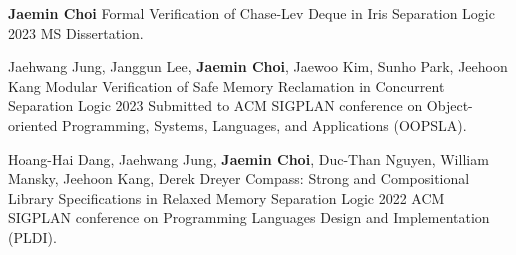 

\begin{cventries}

  \cventry
    {\textbf{Jaemin Choi}} %
    {Formal Verification of Chase-Lev Deque in Iris Separation Logic} %
    {} %
    {2023} %
    {
      MS Dissertation.
    }

  \cventry
    {Jaehwang Jung, Janggun Lee, \textbf{Jaemin Choi}, Jaewoo Kim, Sunho Park, Jeehoon Kang} %
    {Modular Verification of Safe Memory Reclamation in Concurrent Separation Logic} %
    {} %
    {2023} %
    {
      Submitted to ACM SIGPLAN conference on Object-oriented Programming, Systems, Languages, and Applications (OOPSLA).
    }

  \cventry
    {Hoang-Hai Dang, Jaehwang Jung, \textbf{Jaemin Choi}, Duc-Than Nguyen, William Mansky, Jeehoon Kang, Derek Dreyer} %
    {Compass: Strong and Compositional Library Specifications in Relaxed Memory Separation Logic} %
    {} %
    {2022} %
    {
      ACM SIGPLAN conference on Programming Languages Design and Implementation (PLDI).
    }


\end{cventries}
